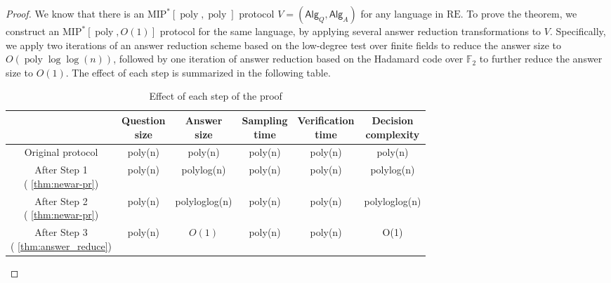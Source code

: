 \documentclass[11pt]{article}
\theoremstyle{plain}
\theoremstyle{definition}
\newcommand{\poly} {\ensuremath{\operatorname{poly}}}
\newcommand{\1}{\mathbb{1}} %
\newcommand{\bF}{\mathbb{F}}
\newcommand{\Alg}{\mathsf{Alg}}
\newcommand{\MIP}{\mathrm{MIP}}
\newcommand{\RE}{\mathrm{RE}}
\begin{document}
\begin{proof}
    We know that there is an $\MIP^\ast[\poly,\poly]$ protocol $V = (\Alg_Q, \Alg_A)$ for any language in $\RE$. To prove the theorem, we construct an $\MIP^\ast[\poly, O(1)]$ protocol for the same language, by applying several answer reduction transformations to $V$. Specifically, we apply two iterations of an answer reduction scheme based on the low-degree test over finite fields to reduce the answer size to $O(\poly\log\log(n))$, followed by one iteration of answer reduction based on the Hadamard code over $\bF_2$ to further reduce the answer size to $O(1)$. The effect of each step is summarized in the following table.
    \begin{table}[h!]
\centering
\begin{tabular}{|c||c|c|c|c|c|}
\hline
 & \makecell{\textbf{Question} \\\textbf{size}} & \makecell{\textbf{Answer}\\ \textbf{size}} & \makecell{\textbf{Sampling}\\ \textbf{time}} & \makecell{\textbf{Verification}\\\textbf{time}} & \makecell{\textbf{Decision}\\\textbf{ complexity}}\\ \hline
Original protocol      & poly(n)      & poly(n)      & poly(n) & poly(n) & poly(n)\\ \hline
\makecell{After Step 1 \\ ( \cref{thm:newar-pr})}     & poly(n)     & polylog(n)   & poly(n)&   poly(n) & polylog(n) \\ \hline
\makecell{After Step 2\\ ( \cref{thm:newar-pr})}     & poly(n)     & polyloglog(n)   & poly(n)&   poly(n) & polyloglog(n) \\ \hline
\makecell{After Step 3 \\ ( \cref{thm:answer_reduce})}     & poly(n)     & $O(1)$   & poly(n)&   poly(n) & O(1) \\ \hline
\end{tabular}
\caption{Effect of each step of the proof}
\label{tab:sample}
\end{table}


\end{proof}
\end{document}
